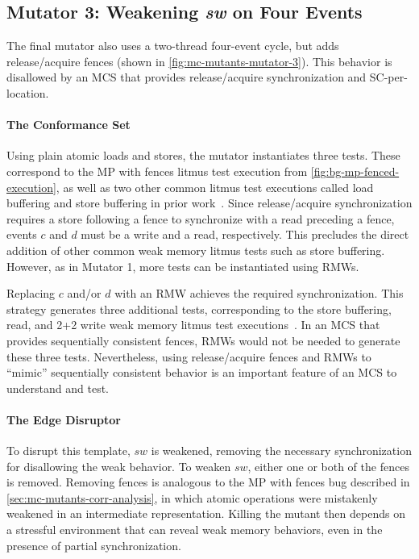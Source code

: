 \subsection{Mutator 3: Weakening \textit{sw} on Four Events \label{sec:mc-mutants-mutator-3}}
The final mutator also uses a two-thread four-event cycle, but adds release/acquire fences (shown in \myfig\ref{fig:mc-mutants-mutator-3}).
This behavior is disallowed by an MCS that provides release/acquire synchronization and SC-per-location.

\paragraph{The Conformance Set} Using plain atomic loads and stores, the mutator instantiates three tests. These correspond to the MP with fences litmus test execution from \myfig\ref{fig:bg-mp-fenced-execution}, as well as two other common litmus test executions called load buffering and store buffering in prior work~\cite{alglave2014herding}. Since release/acquire synchronization requires a store following a fence to synchronize with a read preceding a fence, events $c$ and $d$ must be a write and a read, respectively. This precludes the direct addition of other common weak memory litmus tests such as store buffering. However, as in Mutator 1, more tests can be instantiated using RMWs.

Replacing $c$ and/or $d$ with an RMW achieves the required synchronization. This strategy generates three additional tests, corresponding to the store buffering, read, and 2+2 write weak memory litmus test executions~\cite{alglave2014herding}. In an MCS that provides sequentially consistent fences, RMWs would not be needed to generate these three tests. Nevertheless, using release/acquire fences and RMWs to ``mimic'' sequentially consistent behavior is an important feature of an MCS to understand and test.

\paragraph{The Edge Disruptor} To disrupt this template, $sw$ is weakened, removing the necessary synchronization for disallowing the weak behavior. To weaken $sw$, either one or both of the fences is removed. Removing fences is analogous to the MP with fences bug described in \mysec\ref{sec:mc-mutants-corr-analysis}, in which atomic operations were mistakenly weakened in an intermediate representation. Killing the mutant then depends on a stressful environment that can reveal weak memory behaviors, even in the presence of partial synchronization.

